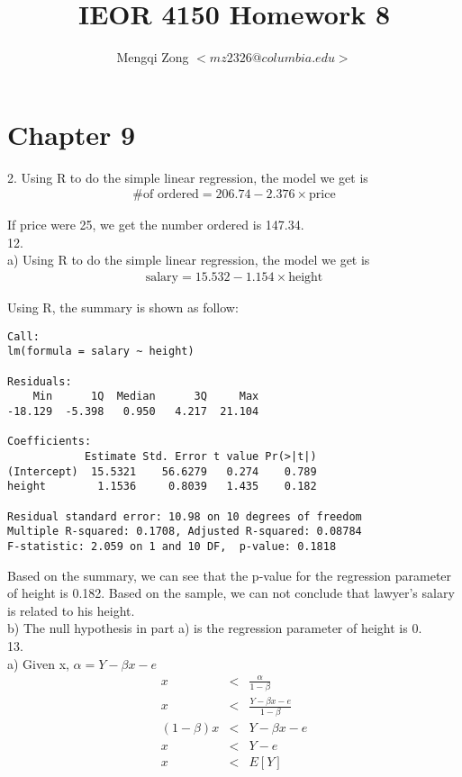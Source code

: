 \documentclass[12pt]{article}
\title{IEOR 4150 Homework 8}
\author{Mengqi Zong $<mz2326@columbia.edu>$}
\begin{document}
\maketitle

\setlength{\parindent}{0in}

\section*{Chapter 9}

2. Using R to do the simple linear regression, the model we get is
\begin{eqnarray*}
  \text{\# of ordered} = 206.74 - 2.376 \times \text{price}
\end{eqnarray*}

If price were 25, we get the number ordered is 147.34. \\

12. \\
a) Using R to do the simple linear regression, the model we get is
\begin{eqnarray*}
  \text{salary} = 15.532 - 1.154 \times \text{height}
\end{eqnarray*}

Using R, the summary is shown as follow:
\begin{verbatim}
Call:
lm(formula = salary ~ height)

Residuals:
    Min      1Q  Median      3Q     Max 
-18.129  -5.398   0.950   4.217  21.104 

Coefficients:
            Estimate Std. Error t value Pr(>|t|)
(Intercept)  15.5321    56.6279   0.274    0.789
height        1.1536     0.8039   1.435    0.182

Residual standard error: 10.98 on 10 degrees of freedom
Multiple R-squared: 0.1708,	Adjusted R-squared: 0.08784 
F-statistic: 2.059 on 1 and 10 DF,  p-value: 0.1818
\end{verbatim}

Based on the summary, we can see that the p-value for the regression parameter of height is 0.182. Based on the sample, we can not conclude that lawyer's salary is related to his height. \\

b) The null hypothesis in part a) is the regression parameter of height is 0. \\

13. \\
a) Given x, $\alpha = Y - \beta x - e$
\begin{eqnarray*}
  x &<& \frac {\alpha}{1 - \beta} \\
  x &<& \frac {Y - \beta x - e}{1 - \beta} \\
  (1 - \beta) x &<& Y - \beta x - e \\
  x &<& Y - e \\
  x &<& E[Y]
\end{eqnarray*}
\end{document}
